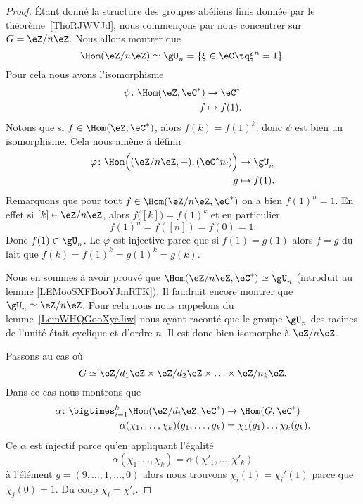 \begin{proof}
	Étant donné la structure des groupes abéliens finis donnée par le théorème~\ref{ThoRJWVJd}, nous commençons par nous concentrer sur \( G=\eZ/n\eZ\). Nous allons montrer que
	\begin{equation}
		\Hom(\eZ/n\eZ)\simeq \gU_n=\{ \xi\in \eC\tq \xi^n=1 \}.
	\end{equation}
	Pour cela nous avons l'isomorphisme
	\begin{equation}
		\begin{aligned}
			\psi\colon \Hom(\eZ,\eC^*) & \to \eC^*     \\
			f                          & \mapsto f(1).
		\end{aligned}
	\end{equation}
	Notons que si \( f\in \Hom(\eZ,\eC^*)\), alors \( f(k)=f(1)^k\), donc \( \psi\) est bien un isomorphisme. Cela nous amène à définir
	\begin{equation}
		\begin{aligned}
			\varphi\colon \Hom\Big( (\eZ/n\eZ,+),(\eC^*n\cdot) \Big) & \to \gU_n     \\
			g                                                        & \mapsto f(1).
		\end{aligned}
	\end{equation}
	Remarquons que pour tout \( f\in\Hom(\eZ/n\eZ,\eC^*)\) on a bien \( f(1)^n=1\). En effet si \( [k]\in \eZ/n\eZ\), alors \( f\big( [k] \big)=f(1)^k\) et en particulier
	\begin{equation}
		f(1)^n=f([n])=f(0)=1.
	\end{equation}
	Donc \( f(1)\in \gU_n\). Le \( \varphi\) est injective parce que si \( f(1)=g(1)\) alors \( f=g\) du fait que \( f(k)=f(1)^k=g(1)^k=g(k)\).

	Nous en sommes à avoir prouvé que \( \Hom(\eZ/n\eZ,\eC^*)\simeq \gU_n\) (introduit au lemme \ref{LEMooSXFBooYJmRTK}). Il faudrait encore montrer que \( \gU_n\simeq \eZ/n\eZ\). Pour cela nous nous rappelons du lemme~\ref{LemWHQGooXyeJiw} nous ayant raconté que le groupe \( \gU_n\) des racines de l'unité était cyclique et d'ordre \( n\). Il est donc bien isomorphe à \( \eZ/n\eZ\).

	Passons au cas où
	\begin{equation}
		G\simeq \eZ/d_1\eZ\times \eZ/d_2\eZ\times \ldots\times \eZ/n_k\eZ.
	\end{equation}
	Dans ce cas nous montrons que
	\begin{equation}
		\begin{aligned}
			\alpha\colon \bigtimes_{i=1}^k\Hom(\eZ/d_i\eZ,\eC^*) & \to \Hom(G,\eC^*)               \\
			\alpha(\chi_1,\ldots, \chi_k)(g_1,\ldots, g_k)       & = \chi_1(g_1)\ldots\chi_k(g_k).
		\end{aligned}
	\end{equation}
	Ce \( \alpha\) est injectif parce qu'en appliquant l'égalité
	\begin{equation}
		\alpha(\chi_1,\ldots, \chi_k)=\alpha(\chi'_1,\ldots, \chi'_k)
	\end{equation}
	à l'élément \( g=(9,\ldots, 1,\ldots, 0)\) alors nous trouvons \( \chi_i(1)=\chi_i'(1)\) parce que \( \chi_j(0)=1\). Du coup \( \chi_i=\chi'_i\).


\end{proof}

